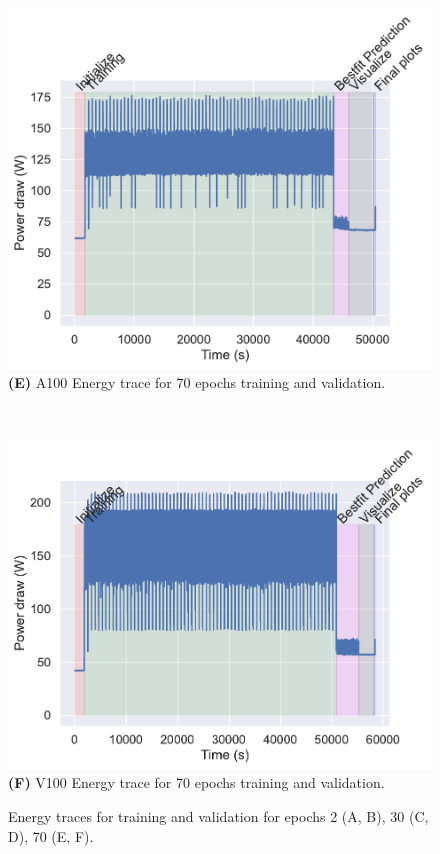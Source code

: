 \documentclass[utf8]{FrontiersinVancouver} %
\begin{document}
\begin{figure}[htb]
\begin{center}
     \begin{minipage}[b]{0.45\textwidth}
       \includegraphics[width=1.0\linewidth]{images/a100-shaded-energy-70-epochs.pdf}
        {\bf (E)} A100 Energy trace for 70 epochs training and validation.
     \end{minipage}
     \ \
     \begin{minipage}[b]{0.45\textwidth}
        \includegraphics[width=1.0\linewidth]{images/v100-shaded-energy-70-epochs.pdf}
        {\bf (F)}  V100 Energy trace for 70 epochs training and validation.
     \end{minipage}
\end{center}

     \caption{Energy traces for training and validation for epochs 2 (A, B), 30 (C, D), 70 (E, F).}
     \label{fig:energy-graphs}
\end{figure}
\end{document}
